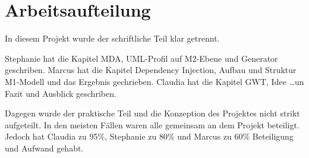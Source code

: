 \chapter{Arbeitsaufteilung}
\label{Arbeitsaufteilung}
In diesem Projekt wurde der schriftliche Teil klar getrennt.

Stephanie hat die Kapitel MDA, UML-Profil auf M2-Ebene und Generator geschriben.
Marcus hat die Kapitel Dependency Injection, Aufbau und Struktur M1-Modell und
das Ergebnis gechrieben.
Claudia hat die Kapitel GWT, Idee \ldots un Fazit und Ausblick geschriben.

Dagegen wurde der praktische Teil und die Konzeption des Projektes nicht
strikt aufgeteilt. In den meisten Fällen waren alle gemeinsam an dem Projekt
beteiligt. Jedoch hat Claudia zu 95\%, Stephanie zu 80\% und Marcus zu 60\%
Beteiligung und Aufwand gehabt.

